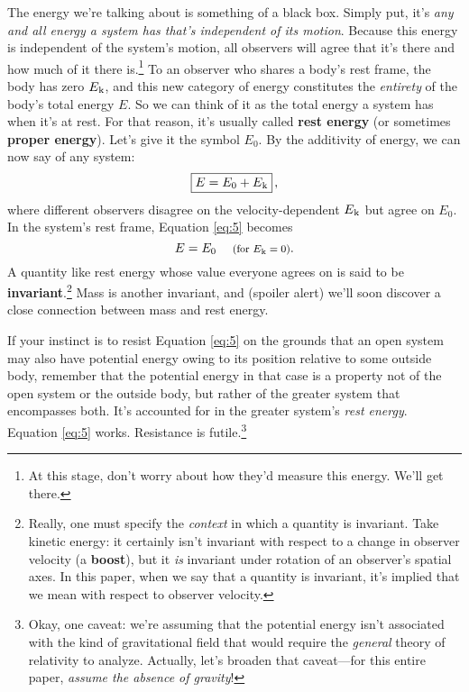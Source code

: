 \documentclass[12pt]{article}
\begin{document}
The energy we're talking about is something of a black box. Simply put, it's \emph{any and all energy a system has that's independent of its motion}. Because this energy is independent of the system's motion, all observers will agree that it's there and how much of it there is.\footnote{\label{fn:re}At this stage, don't worry about how they'd measure this energy. We'll get there.} To an observer who shares a body's rest frame, the body has zero $E_{\mkern.5mu \textrm{k}}$, and this new category of energy constitutes the \emph{entirety} of the body's total energy $E$. So we can think of it as the total energy a system has when it's at rest. For that reason, it's usually called \textbf{rest energy} (or sometimes \textbf{proper energy}). Let's give it the symbol $E_0$. By the additivity of energy, we can now say of any system:
\begin{equation}\label{eq:5}
\boxed{E=E_0+E_{\mkern.5mu \textrm{k}}} \, ,
\end{equation}
where different observers disagree on the velocity-dependent $E_{\mkern.5mu \textrm{k}}$ but agree on $E_0$. In the system's rest frame, Equation \ref{eq:5} becomes
\begin{equation}\label{eq:6}
E=E_0 \quad \textrm{\footnotesize{ (for $E_{\mkern.5mu \textrm{k}}=0$)}}.
\end{equation}
A quantity like rest energy whose value everyone agrees on is said to be \textbf{invariant}.\footnote{\label{fn:inv}Really, one must specify the \emph{context} in which a quantity is invariant. Take kinetic energy: it certainly isn't invariant with respect to a change in observer velocity (a \textbf{boost}), but it \emph{is} invariant under rotation of an observer's spatial axes. In this paper, when we say that a quantity is invariant, it's implied that we mean with respect to observer velocity.} Mass is another invariant, and (spoiler alert) we'll soon discover a close connection between mass and rest energy.

If your instinct is to resist Equation \ref{eq:5} on the grounds that an open system may also have potential energy owing to its position relative to some outside body, remember that the potential energy in that case is a property not of the open system or the outside body, but rather of the greater system that encompasses both. It's accounted for in the greater system's \emph{rest energy}. Equation \ref{eq:5} works. Resistance is futile.\footnote{Okay, one caveat: we're assuming that the potential energy isn't associated with the kind of gravitational field that would require the \emph{general} theory of relativity to analyze. Actually, let's broaden that caveat---for this entire paper, \emph{assume the absence of gravity}!}
\end{document}
